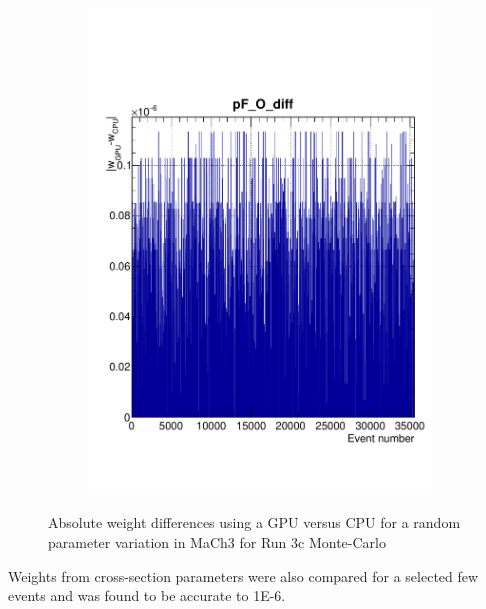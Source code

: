 \begin{figure}[h]
\begin{subfigure}[t]{0.45\textwidth}
		\includegraphics[width=\textwidth, trim={0mm 20mm 0mm 0mm}, clip, page=1]{figures/mach3/Asimov/pfo_diff}
	\end{subfigure}
	\caption{Absolute weight differences using a GPU versus CPU for a random parameter variation in MaCh3 for Run 3c Monte-Carlo}
	\label{fig:cpu_vs_gpu_weight}
\end{figure}

Weights from cross-section parameters were also compared for a selected few events and was found to be accurate to 1E-6. 

